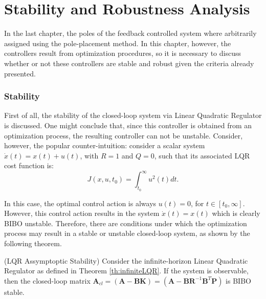 \documentclass[a4paper,11pt]{book}
\numberwithin{figure}{chapter}
\numberwithin{equation}{chapter}
\numberwithin{table}{chapter}
\newtheorem{theorem}{Theorem}[chapter]
\theoremstyle{definition}
\newcounter{boxed-theorem}
\newenvironment{boxed-theorem}[1]
{\colorlet{shadecolor}{pastelBlue2!5} \begin{shaded} \begin{theorem}{#1}}
{\end{theorem} \end{shaded}}
\newcounter{boxed-lemma}
\newcounter{boxed-definition}
\newcounter{boxed-example}
\begin{document}
\section{Stability and Robustness Analysis}

In the last chapter, the poles of the feedback controlled system where arbitrarily assigned using the pole-placement method. In this chapter, however, the controllers result from optimization procedures, so it is necessary to discuss whether or not these controllers are stable and robust given the criteria already presented. 

\subsubsection{Stability}

First of all, the stability of the closed-loop system via Linear Quadratic Regulator is discussed. One might conclude that, since this controller is obtained from an optimization process, the resulting controller can not be unstable. Consider, however, the popular counter-intuition: consider a scalar system $\dot{x}(t) = x(t) + u(t)$, with $R = 1$ and $Q = 0$, such that its associated LQR cost function is:
\begin{equation}
    J(x,u,t_0) = \int_{t_0}^{\infty} u^2(t) dt
.\end{equation}

In this case, the optimal control action is always $u(t) = 0$, for $t \in [t_0, \infty]$. However, this control action results in the system $\dot{x}(t) = x(t)$ which is clearly BIBO unstable. Therefore, there are conditions under which the optimization process may result in a stable or unstable closed-loop system, as shown by the following theorem.

\begin{boxed-theorem}{(LQR Assymptoptic Stability)} \label{th:lqrStab}
    Consider the infinite-horizon Linear Quadratic Regulator as defined in Theorem \ref{th:infiniteLQR}. If the system is observable, then the closed-loop matrix $\bm{A}_{cl} = (\bm{A} - \bm{B}\bm{K}) = (\bm{A} - \bm{B}\bm{R}^{-1}\bm{B}^T\bm{P})$ is BIBO stable.
\end{boxed-theorem}
\end{document}
